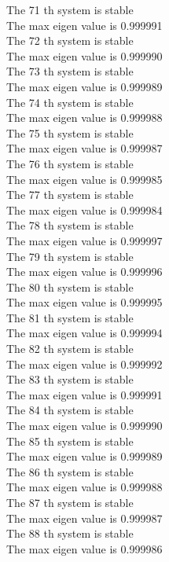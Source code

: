 \documentclass[11pt]{article}
\begin{document}
The 71 th system is stable \\
The max eigen value is 0.999991 \\
The 72 th system is stable \\
The max eigen value is 0.999990 \\
The 73 th system is stable \\
The max eigen value is 0.999989 \\
The 74 th system is stable \\
The max eigen value is 0.999988 \\
The 75 th system is stable \\
The max eigen value is 0.999987 \\
The 76 th system is stable \\
The max eigen value is 0.999985 \\
The 77 th system is stable \\
The max eigen value is 0.999984 \\
The 78 th system is stable \\
The max eigen value is 0.999997 \\
The 79 th system is stable \\
The max eigen value is 0.999996 \\
The 80 th system is stable \\
The max eigen value is 0.999995 \\
The 81 th system is stable \\
The max eigen value is 0.999994 \\
The 82 th system is stable \\
The max eigen value is 0.999992 \\
The 83 th system is stable \\
The max eigen value is 0.999991 \\
The 84 th system is stable \\
The max eigen value is 0.999990 \\
The 85 th system is stable \\
The max eigen value is 0.999989 \\
The 86 th system is stable \\
The max eigen value is 0.999988 \\
The 87 th system is stable \\
The max eigen value is 0.999987 \\
The 88 th system is stable \\
The max eigen value is 0.999986 \\
\end{document}

